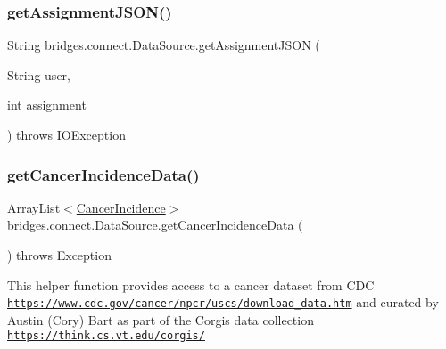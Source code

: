 \mbox{\label{classbridges_1_1connect_1_1_data_source_af55c85da71b588f64ff4b46dbacab7f4}} 
\subsubsection{\texorpdfstring{get\+Assignment\+J\+S\+O\+N()}{getAssignmentJSON()}\hspace{0.1cm}{\footnotesize\ttfamily [2/2]}}
{\footnotesize\ttfamily String bridges.\+connect.\+Data\+Source.\+get\+Assignment\+J\+S\+ON (\begin{DoxyParamCaption}\item[{String}]{user,  }\item[{int}]{assignment }\end{DoxyParamCaption}) throws I\+O\+Exception}

\mbox{\label{classbridges_1_1connect_1_1_data_source_a320ce56eeb655c54c0fbed455e0d9f5e}} 
\subsubsection{\texorpdfstring{get\+Cancer\+Incidence\+Data()}{getCancerIncidenceData()}}
{\footnotesize\ttfamily Array\+List$<$\hyperlink{classbridges_1_1data__src__dependent_1_1_cancer_incidence}{Cancer\+Incidence}$>$ bridges.\+connect.\+Data\+Source.\+get\+Cancer\+Incidence\+Data (\begin{DoxyParamCaption}{ }\end{DoxyParamCaption}) throws Exception}

This helper function provides access to a cancer dataset from C\+DC \href{https://www.cdc.gov/cancer/npcr/uscs/download_data.htm}{\tt https\+://www.\+cdc.\+gov/cancer/npcr/uscs/download\+\_\+data.\+htm} and curated by Austin (Cory) Bart as part of the Corgis data collection \href{https://think.cs.vt.edu/corgis/}{\tt https\+://think.\+cs.\+vt.\+edu/corgis/}

